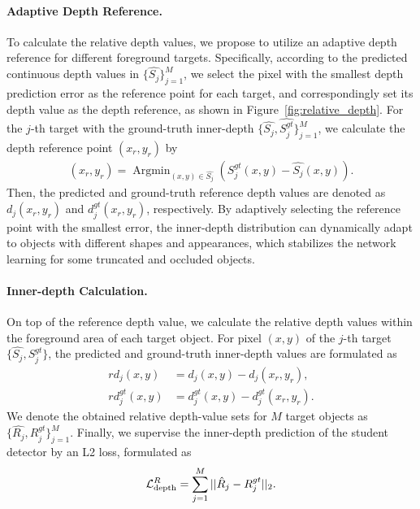  \paragraph{Adaptive Depth Reference.}
 To calculate the relative depth values, we propose to utilize an adaptive depth reference for different foreground targets.
 Specifically, according to the predicted continuous depth values in $\{\hat{S_j}\}_{j=1}^M$, we select the pixel with the smallest depth prediction error as the reference point for each target, and correspondingly set its depth value as the depth reference, as shown in Figure~\ref{fig:relative_depth}. For the $j$-th target with the ground-truth inner-depth $\{\hat{S_j}, \hat{S^{gt}_j}\}_{j=1}^M$, we calculate the depth reference point $(x_r, y_r)$ by
  \begin{equation}
 \label{eq:FM}
 \begin{aligned}
    (x_r, y_r) = \mathop{\text{Argmin}}_{(x, y)\in \hat{S_j}} \left ({S^{gt}_j}(x, y) - {\hat{S_j}}(x, y)\right ).
 \end{aligned}
 \end{equation}
 Then, the predicted and ground-truth reference depth values are denoted as $d_j(x_r, y_r)$ and $d^{gt}_j(x_r, y_r)$, respectively. By adaptively selecting the reference point with the smallest error, the inner-depth distribution can dynamically adapt to objects with different shapes and appearances, which stabilizes the network learning for some truncated and occluded objects.

\paragraph{Inner-depth Calculation.}
On top of the reference depth value, we calculate the relative depth values within the foreground area of each target object. For pixel $(x, y)$ of the $j$-th target $\{\hat{S_j}, S_j^{gt}\}$, the predicted and ground-truth inner-depth values are formulated as
\begin{equation}
 \label{eq:FM}
 \begin{aligned}
    rd_j(x, y) &= d_j(x, y) - d_j(x_r, y_r),\\
    rd^{gt}_j(x, y) &= d^{gt}_j(x, y) - d^{gt}_j(x_r, y_r).
 \end{aligned}
 \end{equation}
 We denote the obtained relative depth-value sets for $M$ target objects as $\{\hat{R_j}, R_j^{gt}\}_{j=1}^M$. Finally, we supervise the inner-depth prediction of the student detector by an L2 loss, formulated as
 \begin{equation}
\label{eq:FM}
    \mathcal{L}_{\rm{depth}}^{R} = \sum_{j=1}^M ||\hat{R}_{j}-R^{gt}_{j}||_2.
\end{equation}
 
